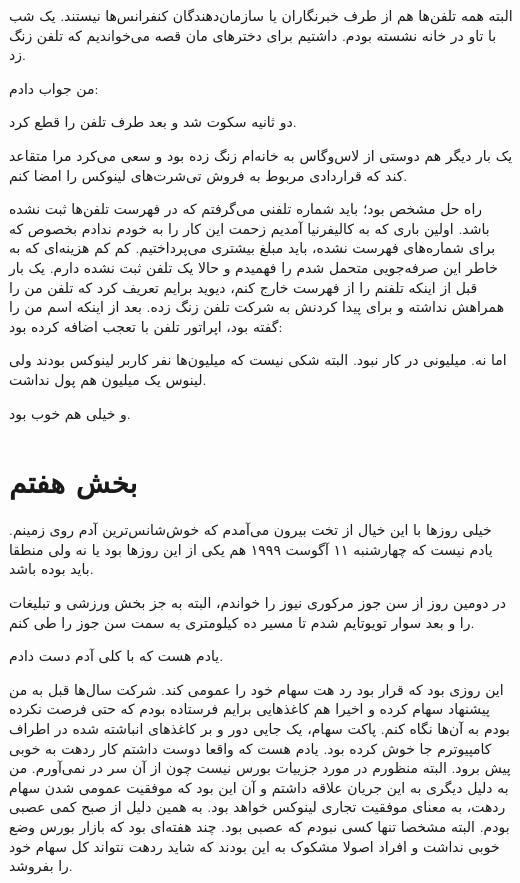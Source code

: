 البته همه تلفن‌ها هم از طرف خبرنگاران یا سازمان‌دهندگان کنفرانس‌ها
نیستند. یک شب با تاو در خانه نشسته بودم. داشتیم برای دخترهای مان قصه
می‌خواندیم که تلفن زنگ زد.

من جواب دادم: 



دو ثانیه سکوت شد و بعد طرف تلفن را قطع کرد.

یک بار دیگر هم دوستی از لاس‌وگاس به خانه‌ام زنگ زده بود و سعی می‌کرد مرا
متقاعد کند که قراردادی مربوط به فروش تی‌شرت‌های لینوکس را امضا کنم.

راه حل مشخص بود؛ باید شماره تلفنی می‌گرفتم که در فهرست تلفن‌ها ثبت نشده
باشد. اولین باری که به کالیفرنیا آمدیم زحمت این کار را به خودم ندادم
بخصوص که برای شماره‌های فهرست نشده، باید مبلغ بیشتری می‌پرداختیم. کم کم
هزینه‌ای که به خاطر این صرفه‌جویی متحمل شدم را فهمیدم و حالا یک تلفن ثبت
نشده دارم. یک بار قبل از اینکه تلفنم را از فهرست خارج کنم، دیوید برایم
تعریف کرد که تلفن من را همراهش نداشته و برای پیدا کردنش به شرکت تلفن
زنگ زده. بعد از اینکه اسم من را گفته بود، اپراتور تلفن با تعجب اضافه
کرده بود: 

اما نه. میلیونی در کار نبود. البته شکی نیست که میلیون‌ها نفر کاربر
لینوکس بودند ولی لینوس یک میلیون هم پول نداشت.

و خیلی هم خوب بود.

\section{بخش هفتم}
خیلی روزها با این خیال از تخت بیرون می‌آمدم که خوش‌شانس‌ترین آدم روی
زمینم. یادم نیست که چهارشنبه ۱۱ آگوست ۱۹۹۹ هم یکی از این روزها بود یا
نه ولی منطقا باید بوده باشد.

در دومین روز از سن جوز مرکوری نیوز را
خواندم، البته به جز بخش ورزشی و تبلیغات را و بعد سوار تویوتایم شدم تا
مسیر ده کیلومتری به سمت سن جوز را طی کنم.

یادم هست که با کلی آدم دست دادم. 

این روزی بود که قرار بود رد هت سهام خود را عمومی کند. شرکت سال‌ها قبل
به من پیشنهاد سهام کرده و اخیرا هم کاغذهایی برایم فرستاده بودم که حتی
فرصت نکرده بودم به آن‌ها نگاه کنم. پاکت سهام، یک جایی دور و بر کاغذهای
انباشته شده در اطراف کامپیوترم جا خوش کرده بود. یادم هست که واقعا دوست
داشتم کار ردهت به خوبی پیش برود. البته منظورم در مورد جزییات بورس نیست
چون از آن سر در نمی‌آورم. من به دلیل دیگری به این جریان علاقه داشتم و
آن این بود که موفقیت عمومی شدن سهام ردهت، به معنای موفقیت تجاری لینوکس
خواهد بود. به همین دلیل از صبح کمی عصبی بودم. البته مشخصا تنها کسی
نبودم که عصبی بود. چند هفته‌ای بود که بازار بورس وضع خوبی نداشت و افراد
اصولا مشکوک به این بودند که شاید ردهت نتواند کل سهام خود را بفروشد.

